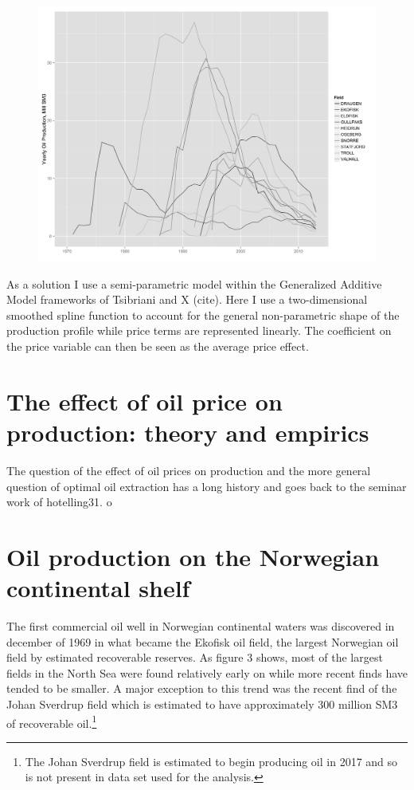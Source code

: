 \documentclass[12pt]{scrartcl} %
\begin{document}
\begin{figure}
	\includegraphics[width=.8\textwidth]{top10_production.png}
	\end{figure}

As a solution I use a semi-parametric model within the Generalized Additive Model frameworks of Tsibriani and X (cite).  Here I use a two-dimensional smoothed spline function to account for the general non-parametric shape of the production profile while price terms are represented linearly.  The coefficient on the price variable can then be seen as the average price effect.  

\section{The effect of oil price on production: theory and empirics}
The question of the effect of oil prices on production and the more general question of optimal oil extraction has a long history and goes back to the seminar work of hotelling31.  o

\section{Oil production on the Norwegian continental shelf}
The first commercial oil well in Norwegian continental waters was discovered in december of 1969 in what became the Ekofisk oil field, the largest Norwegian oil field by estimated recoverable reserves.  As figure 3 shows, most of the largest fields in the North Sea were found relatively early on while more recent finds have tended to be smaller.  A major exception to this trend was the recent find of the Johan Sverdrup field which is estimated to have approximately 300 million SM3 of recoverable oil.\footnote{The Johan Sverdrup field is estimated to begin producing oil in 2017 and so is not present in data set used for the analysis.}  
\end{document}
